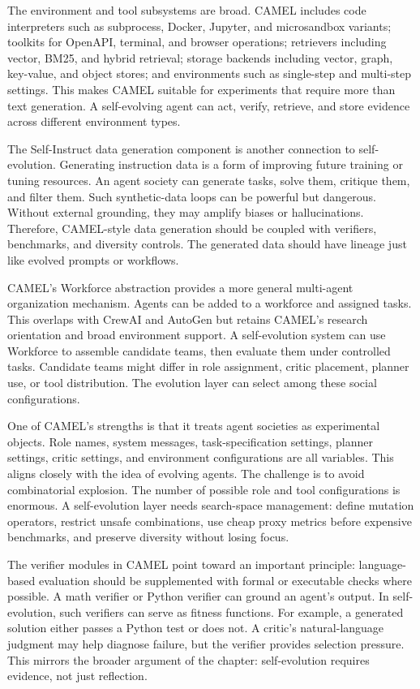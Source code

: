 The environment and tool subsystems are broad.  CAMEL includes code interpreters such as subprocess, Docker, Jupyter, and microsandbox variants; toolkits for OpenAPI, terminal, and browser operations; retrievers including vector, BM25, and hybrid retrieval; storage backends including vector, graph, key-value, and object stores; and environments such as single-step and multi-step settings.  This makes CAMEL suitable for experiments that require more than text generation.  A self-evolving agent can act, verify, retrieve, and store evidence across different environment types.

The Self-Instruct data generation component is another connection to self-evolution.  Generating instruction data is a form of improving future training or tuning resources.  An agent society can generate tasks, solve them, critique them, and filter them.  Such synthetic-data loops can be powerful but dangerous.  Without external grounding, they may amplify biases or hallucinations.  Therefore, CAMEL-style data generation should be coupled with verifiers, benchmarks, and diversity controls.  The generated data should have lineage just like evolved prompts or workflows.

CAMEL's Workforce abstraction provides a more general multi-agent organization mechanism.  Agents can be added to a workforce and assigned tasks.  This overlaps with CrewAI and AutoGen but retains CAMEL's research orientation and broad environment support.  A self-evolution system can use Workforce to assemble candidate teams, then evaluate them under controlled tasks.  Candidate teams might differ in role assignment, critic placement, planner use, or tool distribution.  The evolution layer can select among these social configurations.

One of CAMEL's strengths is that it treats agent societies as experimental objects.  Role names, system messages, task-specification settings, planner settings, critic settings, and environment configurations are all variables.  This aligns closely with the idea of evolving agents.  The challenge is to avoid combinatorial explosion.  The number of possible role and tool configurations is enormous.  A self-evolution layer needs search-space management: define mutation operators, restrict unsafe combinations, use cheap proxy metrics before expensive benchmarks, and preserve diversity without losing focus.

The verifier modules in CAMEL point toward an important principle: language-based evaluation should be supplemented with formal or executable checks where possible.  A math verifier or Python verifier can ground an agent's output.  In self-evolution, such verifiers can serve as fitness functions.  For example, a generated solution either passes a Python test or does not.  A critic's natural-language judgment may help diagnose failure, but the verifier provides selection pressure.  This mirrors the broader argument of the chapter: self-evolution requires evidence, not just reflection.

